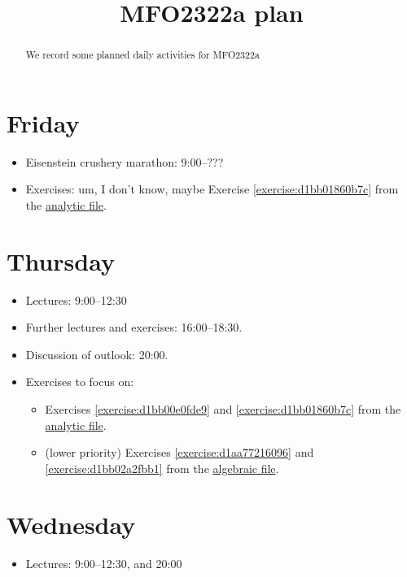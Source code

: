 \documentclass[reqno]{amsart} 
\title{MFO2322a plan}
\begin{document}
\begin{abstract}
  We record some planned daily activities for MFO2322a
\end{abstract}

\section{Friday}
\begin{itemize}
\item Eisenstein crushery marathon: 9:00--???
\item Exercises: um, I don't know, maybe Exercise \ref{exercise:d1bb01860b7c} from the \href{20230524T094424__exercises-localized-vectors.pdf}{analytic file}.
\end{itemize}

\section{Thursday}
\begin{itemize}
\item Lectures: 9:00--12:30
\item Further lectures and exercises: 16:00--18:30.
\item Discussion of outlook: 20:00.
\item Exercises to focus on:
\begin{itemize}
\item Exercises \ref{exercise:d1bb00e0fde9} and \ref{exercise:d1bb01860b7c} from the \href{20230524T094424__exercises-localized-vectors.pdf}{analytic file}.
\item (lower priority) Exercises \ref{exercise:d1aa77216096} and \ref{exercise:d1bb02a2fbb1} from the \href{20230528T213149__microlocal-algebraic-exercises.pdf}{algebraic file}.
\end{itemize}
\end{itemize}


\section{Wednesday}
\begin{itemize}
\item Lectures: 9:00--12:30, and 20:00
\end{itemize}
\end{document}
